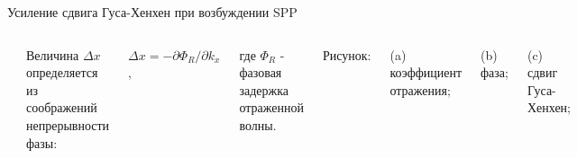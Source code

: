 \documentclass[9pt, compress, xcolor=table]{beamer}
\begin{document}
\begin{frame}{Усиление сдвига Гуса-Хенхен при возбуждении SPP}

\begin{columns}[c]
\column{2.8in}
\begin{center}
\includegraphics[width=0.8\textwidth]{gh6}
\end{center}

\column{1.8in}

Величина $\Delta x$ определяется из соображений непрерывности фазы:

$\Delta x = -\partial \Phi_R / \partial k_x$,

где $\Phi_R$ - фазовая задержка отраженной волны.

Рисунок:

(a) коэффициент отражения;

(b) фаза;

(c) сдвиг Гуса-Хенхен;
\end{columns}

\end{frame}
\end{document}
